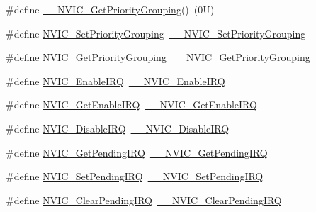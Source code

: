 \begin{DoxyCompactItemize}
\item 
\#define \hyperlink{group___c_m_s_i_s___core___n_v_i_c_functions_gab2072fe50f6d7cd208f6768919f59fae}{\+\_\+\+\_\+\+N\+V\+I\+C\+\_\+\+Get\+Priority\+Grouping}()~(0\+U)
\item 
\#define \hyperlink{group___c_m_s_i_s___core___n_v_i_c_functions_ga0e798d5aec68cdd8263db86a76df788f}{N\+V\+I\+C\+\_\+\+Set\+Priority\+Grouping}~\hyperlink{group___c_m_s_i_s___core___n_v_i_c_functions_gafc94dcbaee03e4746ade1f5bb9aaa56d}{\+\_\+\+\_\+\+N\+V\+I\+C\+\_\+\+Set\+Priority\+Grouping}
\item 
\#define \hyperlink{group___c_m_s_i_s___core___n_v_i_c_functions_ga4eeb9214f2264fc23c34ad5de2d3fa11}{N\+V\+I\+C\+\_\+\+Get\+Priority\+Grouping}~\hyperlink{group___c_m_s_i_s___core___n_v_i_c_functions_ga9b894af672df4373eb637f8288845c05}{\+\_\+\+\_\+\+N\+V\+I\+C\+\_\+\+Get\+Priority\+Grouping}
\item 
\#define \hyperlink{group___c_m_s_i_s___core___n_v_i_c_functions_ga57b3064413dbc7459d9646020fdd8bef}{N\+V\+I\+C\+\_\+\+Enable\+I\+RQ}~\hyperlink{group___c_m_s_i_s___core___n_v_i_c_functions_ga71227e1376cde11eda03fcb62f1b33ea}{\+\_\+\+\_\+\+N\+V\+I\+C\+\_\+\+Enable\+I\+RQ}
\item 
\#define \hyperlink{group___c_m_s_i_s___core___n_v_i_c_functions_ga857de13232ec65dd15087eaa15bc4a69}{N\+V\+I\+C\+\_\+\+Get\+Enable\+I\+RQ}~\hyperlink{group___c_m_s_i_s___core___n_v_i_c_functions_gaaeb5e7cc0eaad4e2817272e7bf742083}{\+\_\+\+\_\+\+N\+V\+I\+C\+\_\+\+Get\+Enable\+I\+RQ}
\item 
\#define \hyperlink{group___c_m_s_i_s___core___n_v_i_c_functions_ga73b4e251f59cab4e9a5e234aac02ae57}{N\+V\+I\+C\+\_\+\+Disable\+I\+RQ}~\hyperlink{group___c_m_s_i_s___core___n_v_i_c_functions_gae016e4c1986312044ee768806537d52f}{\+\_\+\+\_\+\+N\+V\+I\+C\+\_\+\+Disable\+I\+RQ}
\item 
\#define \hyperlink{group___c_m_s_i_s___core___n_v_i_c_functions_gac608957a239466e9e0cbc30aa64feb3b}{N\+V\+I\+C\+\_\+\+Get\+Pending\+I\+RQ}~\hyperlink{group___c_m_s_i_s___core___n_v_i_c_functions_ga5a92ca5fa801ad7adb92be7257ab9694}{\+\_\+\+\_\+\+N\+V\+I\+C\+\_\+\+Get\+Pending\+I\+RQ}
\item 
\#define \hyperlink{group___c_m_s_i_s___core___n_v_i_c_functions_ga2b47e2e52cf5c48a5c3348636434b3ac}{N\+V\+I\+C\+\_\+\+Set\+Pending\+I\+RQ}~\hyperlink{group___c_m_s_i_s___core___n_v_i_c_functions_gaabefdd4b790b9a7308929938c0c1e1ad}{\+\_\+\+\_\+\+N\+V\+I\+C\+\_\+\+Set\+Pending\+I\+RQ}
\item 
\#define \hyperlink{group___c_m_s_i_s___core___n_v_i_c_functions_ga590cf113000a079b1f0ea3dcd5b5316c}{N\+V\+I\+C\+\_\+\+Clear\+Pending\+I\+RQ}~\hyperlink{group___c_m_s_i_s___core___n_v_i_c_functions_ga562a86dbdf14827d0fee8fdafb04d191}{\+\_\+\+\_\+\+N\+V\+I\+C\+\_\+\+Clear\+Pending\+I\+RQ}

\end{DoxyCompactItemize}
